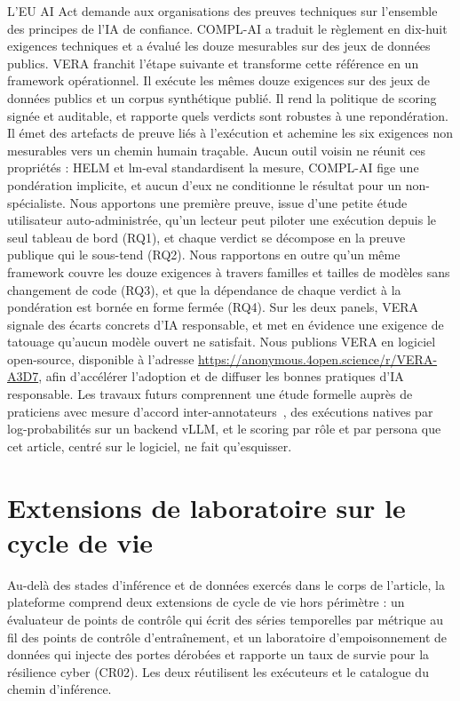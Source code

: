 \documentclass[10pt,conference]{IEEEtran}
\providecommand{\repourl}{https://anonymous.4open.science/r/VERA-A3D7}
\begin{document}
L'EU AI Act demande aux organisations des preuves techniques sur l'ensemble des principes de l'IA de confiance.
COMPL-AI a traduit le règlement en dix-huit exigences techniques et a évalué les douze mesurables sur des jeux de données publics.
VERA franchit l'étape suivante et transforme cette référence en un framework opérationnel.
Il exécute les mêmes douze exigences sur des jeux de données publics et un corpus synthétique publié.
Il rend la politique de scoring signée et auditable, et rapporte quels verdicts sont robustes à une repondération.
Il émet des artefacts de preuve liés à l'exécution et achemine les six exigences non mesurables vers un chemin humain traçable.
Aucun outil voisin ne réunit ces propriétés : HELM et lm-eval standardisent la mesure, COMPL-AI fige une pondération implicite, et aucun d'eux ne conditionne le résultat pour un non-spécialiste.
Nous apportons une première preuve, issue d'une petite étude utilisateur auto-administrée, qu'un lecteur peut piloter une exécution depuis le seul tableau de bord (RQ1), et chaque verdict se décompose en la preuve publique qui le sous-tend (RQ2).
Nous rapportons en outre qu'un même framework couvre les douze exigences à travers familles et tailles de modèles sans changement de code (RQ3), et que la dépendance de chaque verdict à la pondération est bornée en forme fermée (RQ4).
Sur les deux panels, VERA signale des écarts concrets d'IA responsable, et met en évidence une exigence de tatouage qu'aucun modèle ouvert ne satisfait.
Nous publions VERA en logiciel open-source, disponible à l'adresse \url{\repourl}, afin d'accélérer l'adoption et de diffuser les bonnes pratiques d'IA responsable.
Les travaux futurs comprennent une étude formelle auprès de praticiens avec mesure d'accord inter-annotateurs~\cite{hayes2007krippendorff,studtmann2023histree}, des exécutions natives par log-probabilités sur un backend vLLM, et le scoring par rôle et par persona que cet article, centré sur le logiciel, ne fait qu'esquisser.

{\footnotesize


}

\appendices

\section{Extensions de laboratoire sur le cycle de vie}
\label{app:lifecycle}
Au-delà des stades d'inférence et de données exercés dans le corps de l'article, la plateforme comprend deux extensions de cycle de vie hors périmètre : un évaluateur de points de contrôle qui écrit des séries temporelles par métrique au fil des points de contrôle d'entraînement, et un laboratoire d'empoisonnement de données qui injecte des portes dérobées et rapporte un taux de survie pour la résilience cyber (CR02).
Les deux réutilisent les exécuteurs et le catalogue du chemin d'inférence.
\end{document}

